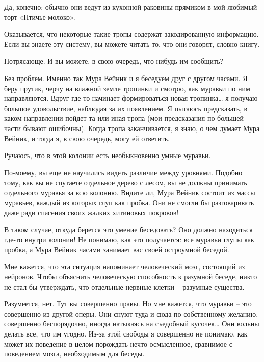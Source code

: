 \documentclass[../main.tex]{subfiles}
\begin{document}
\begin{dialogue}
 Да, конечно; обычно они ведут из кухонной раковины прямиком в мой любимый торт «Птичье молоко».

 Оказывается, что некоторые такие тропы содержат закодированную информацию. Если вы знаете эту систему, вы можете читать то, что они говорят, словно книгу.

 Потрясающе. И вы можете, в свою очередь, что-нибудь им сообщить?

 Без проблем. Именно так Мура Вейник и я беседуем друг с другом часами. Я беру прутик, черчу на влажной земле тропинки и смотрю, как муравьи по ним направляются. Вдруг где-то начинает формироваться новая тропинка\ldots{} я получаю большое удовольствие, наблюдая за их появлением. Я пытаюсь предсказать, в каком направлении пойдет та или иная тропа (мои предсказания по большей части бывают ошибочны). Когда тропа заканчивается, я знаю, о чем думает Мура Вейник, и тогда я, в свою очередь, могу ей ответить.

 Ручаюсь, что в этой колонии есть необыкновенно умные муравьи.

 По-моему, вы еще не научились видеть различие между уровнями. Подобно тому, как вы не спутаете отдельное дерево с лесом, вы не должны принимать отдельного муравья за всю колонию. Видите ли, Мура Вейник состоит из массы муравьев, каждый из которых глуп как пробка. Они не смогли бы разговаривать даже ради спасения своих жалких хитиновых покровов!

 В таком случае, откуда берется это умение беседовать? Оно должно находиться где-то внутри колонии! Не понимаю, как это получается: все муравьи глупы как пробка, а Мура Вейник часами занимает вас своей остроумной беседой.

 Мне кажется, что эта ситуация напоминает человеческий мозг, состоящий из нейронов. Чтобы объяснить человеческую способность к разумной беседе, никто не стал бы утверждать, что отдельные нервные клетки \--- разумные существа.

 Разумеется, нет. Тут вы совершенно правы. Но мне кажется, что муравьи \--- это совершенно из другой оперы. Они снуют туда и сюда по собственному желанию, совершенно беспорядочно, иногда натыкаясь на съедобный кусочек\ldots{} Они вольны делать все, что им угодно. Из-за этой свободы я совершенно не понимаю, как может их поведение в целом порождать нечто осмысленное, сравнимое с поведением мозга, необходимым для беседы.


\end{dialogue}
\end{document}
